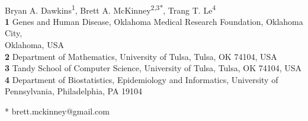 \documentclass[10pt,letterpaper]{article}
\begin{document}
\vspace*{0.2in}

\begin{flushleft}
{\Large
\textbf{} %
}
\newline
\\
Bryan A. Dawkins\textsuperscript{1},
Brett A. McKinney\textsuperscript{2,3*},
Trang T. Le\textsuperscript{4}
\\
\bigskip
\textbf{1} Genes and Human Disease, Oklahoma Medical Research Foundation, Oklahoma City, \\
\hphantom{1} Oklahoma, USA
\\
\textbf{2} Department of Mathematics, University of Tulsa, Tulsa, OK 74104, USA
\\
\textbf{3} Tandy School of Computer Science, University of Tulsa, Tulsa, OK 74104, USA
\\
\textbf{4} Department of Biostatistics, Epidemiology and Informatics, University of \\
\hphantom{4} Pennsylvania, Philadelphia, PA 19104
\\
\bigskip

% 
%





* brett.mckinney@gmail.com

\end{flushleft}
\end{document}

